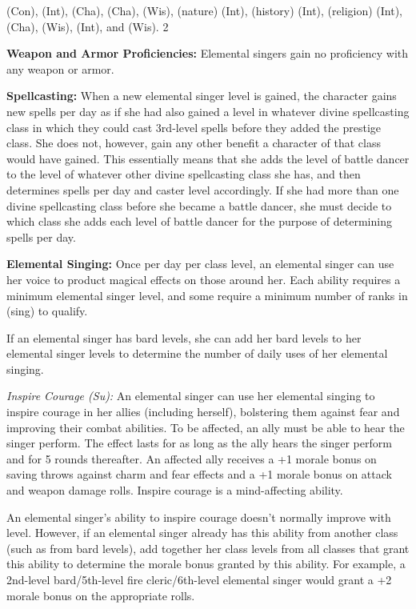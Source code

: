 {
 (Con),  (Int),  (Cha),  (Cha),  (Wis),  (nature) (Int),  (history) (Int),  (religion) (Int),  (Cha),  (Wis),  (Int), and  (Wis).
}
{2}
{}{}
{
\textbf{Weapon and Armor Proficiencies:} Elemental singers gain no proficiency with any weapon or armor.

\textbf{Spellcasting:} When a new elemental singer level is gained, the character gains new spells per day as if she had also gained a level in whatever divine spellcasting class in which they could cast 3rd-level spells before they added the prestige class. She does not, however, gain any other benefit a character of that class would have gained. This essentially means that she adds the level of battle dancer to the level of whatever other divine spellcasting class she has, and then determines spells per day and caster level accordingly. If she had more than one divine spellcasting class before she became a battle dancer, she must decide to which class she adds each level of battle dancer for the purpose of determining spells per day.

\textbf{Elemental Singing:} Once per day per class level, an elemental singer can use her voice to product magical effects on those around her. Each ability requires a minimum elemental singer level, and some require a minimum number of ranks in  (sing) to qualify.

If an elemental singer has bard levels, she can add her bard levels to her elemental singer levels to determine the number of daily uses of her elemental singing.

\textit{Inspire Courage (Su):} An elemental singer can use her elemental singing to inspire courage in her allies (including herself), bolstering them against fear and improving their combat abilities. To be affected, an ally must be able to hear the singer perform. The effect lasts for as long as the ally hears the singer perform and for 5 rounds thereafter. An affected ally receives a +1 morale bonus on saving throws against charm and fear effects and a +1 morale bonus on attack and weapon damage rolls. Inspire courage is a mind-affecting ability.

An elemental singer's ability to inspire courage doesn't normally improve with level. However, if an elemental singer already has this ability from another class (such as from bard levels), add together her class levels from all classes that grant this ability to determine the morale bonus granted by this ability. For example, a 2nd-level bard/5th-level fire cleric/6th-level elemental singer would grant a +2 morale bonus on the appropriate rolls.

}
